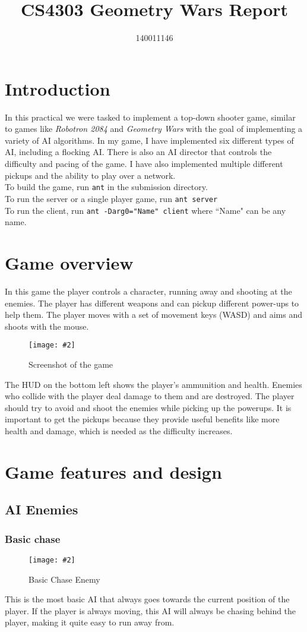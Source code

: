 \documentclass{article}
\title{CS4303 Geometry Wars Report}
\author{140011146}
\newcommand{\n}[0]{\\[\baselineskip]}
\newcommand{\figimg}[3]{
  \begin{figure}[H]
    \centering
    \texttt{[image: \#2]}
    \caption{#3}
  \end{figure}
  \noindent 
}
\begin{document}
\maketitle

\section{Introduction}
In this practical we were tasked to implement a top-down shooter game, similar to games like \textit{Robotron 2084} and \textit{Geometry Wars} with the goal of implementing a variety of AI algorithms. In my game, I have implemented six different types of AI, including a flocking AI. There is also an AI director that controls the difficulty and pacing of the game. I have also implemented multiple different pickups and the ability to play over a network.
\n
To build the game, run \texttt{ant} in the submission directory.
\\
\noindent
To run the server or a single player game, run \texttt{ant server}
\\
\noindent
To run the client, run \texttt{ant -Darg0="Name" client} where ``Name" can be any name.
\section{Game overview}
In this game the player controls a character, running away and shooting at the enemies. The player has different weapons and can pickup different power-ups to help them. The player moves with a set of movement keys (WASD) and aims and shoots with the mouse.
\figimg{1}{imgs/Screenshot.png}{Screenshot of the game}
The HUD on the bottom left shows the player's ammunition and health. Enemies who collide with the player deal damage to them and are destroyed. The player should try to avoid and shoot the enemies while picking up the powerups. It is important to get the pickups because they provide useful benefits like more health and damage, which is needed as the difficulty increases.
\section{Game features and design}
\subsection{AI Enemies}
\subsubsection{Basic chase}
\figimg{0.1}{imgs/BasicChaseEnemy.png}{Basic Chase Enemy}
This is the most basic AI that always goes towards the current position of the player. If the player is always moving, this AI will always be chasing behind the player, making it quite easy to run away from.
\end{document}

